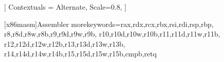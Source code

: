 \usepackage{xcolor}
\usepackage{listings}
\usepackage[cache=false]{minted}

\usepackage{fontspec}
\setmonofont{JetBrains Mono}[
    Contextuals = Alternate,
    Scale=0.8,
]

\usepackage{listings}
\lstset{
    basicstyle = \ttfamily,
    columns = flexible,
}
\makeatletter
\renewcommand*\verbatim@nolig@list{}
\makeatother



\newcommand{\clang}{\lstset{language=C,
        basicstyle=\ttfamily,
        keywordstyle=\color{blue}\ttfamily,
        stringstyle=\color{green}\ttfamily,
        commentstyle=\color{gray},
        morecomment=[l][\color{gray}]{\#},
        numberstyle=\tiny\color{orange},
        breaklines=true,
}}

\newcommand{\shell}{\lstset{
    language=,
    basicstyle=\ttfamily,
    stringstyle=\color{black}\ttfamily,
}}


   [x86masm]{Assembler} %
   {morekeywords={rax,rdx,rcx,rbx,rsi,rdi,rsp,rbp, %
                  r8,r8d,r8w,r8b,r9,r9d,r9w,r9b, %
                  r10,r10d,r10w,r10b,r11,r11d,r11w,r11b, %
                  r12,r12d,r12w,r12b,r13,r13d,r13w,r13b, %
                  r14,r14d,r14w,r14b,r15,r15d,r15w,r15b,cmpb,retq}} %


\newcommand{\asm}{\lstset{
    language=[x64]Assembler,
    morecomment=[l][\color{gray}]{\#},
    keywordstyle=\color{blue}\ttfamily,
}}



\newcommand{\ml}[1]{\texttt{#1}}
\newcommand{\cc}[1]{\texttt{#1}}


\let\olditemize=\itemize \let\endolditemize=\enditemize \renewenvironment{itemize}{\olditemize \itemsep-0.4em}{\endolditemize}

\let\oldenumerate=\enumerate \let\endoldenumerate=\endenumerate \renewenvironment{enumerate}{\oldenumerate \itemsep-0.4em}{\endoldenumerate}
